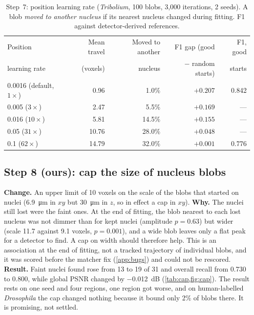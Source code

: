 \documentclass[
  paper=a4,
  fontsize=11pt,
  english,
  numbers=noenddot,
  parskip=half,
  cdgeometry=symmetric,
  cd=barcolor,
  cdfont=false
]{tudscrartcl}
\begin{document}
\begin{table}[tb]
  \centering\small
  \begin{tabular}{@{}lrrrr@{}}
    \toprule
    Position          & Mean travel & Moved to another & F1 gap (good    & F1, good \\
    learning rate     & (voxels)    & nucleus          & $-$ random starts) & starts \\
    \midrule
    0.0016 (default, $1\times$) & 0.96 & 1.0\% & $+0.207$ & 0.842 \\
    0.005 ($3\times$) & 2.47 & 5.5\% & $+0.169$ & --- \\
    0.016 ($10\times$) & 5.81 & 14.5\% & $+0.155$ & --- \\
    0.05 ($31\times$) & 10.76 & 28.0\% & $+0.048$ & --- \\
    0.1 ($62\times$) & 14.79 & 32.0\% & $+0.001$ & 0.776 \\
    \bottomrule
  \end{tabular}
  \caption{Step~7: position learning rate (\emph{Tribolium}, 100 blobs, 3{,}000 iterations, 2
  seeds). A blob \emph{moved to another nucleus} if its nearest nucleus changed during fitting.
  F1 against detector-derived references.}
  \label{tab:lr}
\end{table}

\subsection{Step 8 (ours): cap the size of nucleus blobs}

\textbf{Change.} An upper limit of 10 voxels on the scale of the blobs that started on nuclei
(\SI{6.9}{\micro\meter} in $xy$ but \SI{30}{\micro\meter} in $z$, so in effect a cap in $xy$). \textbf{Why.} The nuclei still
lost were the faint ones. At the end of fitting, the blob nearest to each lost nucleus was not
dimmer than for kept nuclei (amplitude $p=0.63$) but wider (scale 11.7 against 9.1 voxels,
$p=0.001$), and a wide blob leaves only a flat peak for a detector to find. A cap on width
should therefore help. This is an association at the end of fitting, not a tracked trajectory
of individual blobs, and it was scored before the matcher fix (\cref{app:bugs}) and could not
be rescored. \textbf{Result.} Faint nuclei found
rose from 13 to 19 of 31 and overall recall from 0.730 to 0.800, while global PSNR changed by
\SI{-0.012}{dB} (\cref{tab:cap,fig:cap}). The result rests on one seed and four regions, one
region got worse, and on human-labelled \emph{Drosophila} the cap changed nothing because it
bound only 2\% of blobs there. It is promising, not settled.
\end{document}
